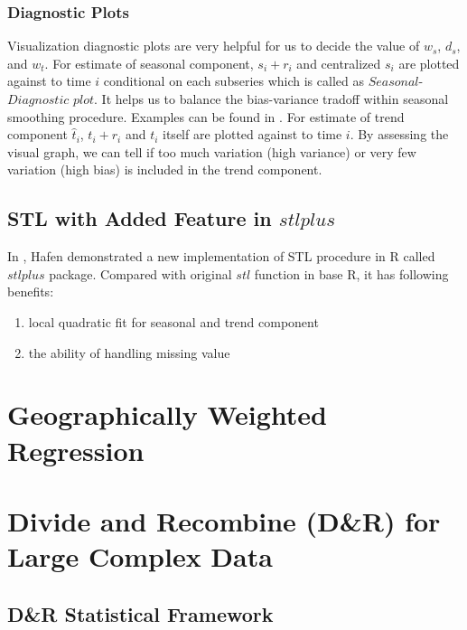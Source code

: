 \subsubsection{Diagnostic Plots}

Visualization diagnostic plots are very helpful for us to decide the value of 
$w_s$, $d_s$, and $w_t$. For estimate of seasonal component, $s_i + r_i$ and 
centralized $s_i$ are plotted against to time $i$ conditional on each subseries 
which is called as $Seasonal$-$Diagnostic$ $plot$. It helps us to balance the
bias-variance tradoff within seasonal smoothing procedure. Examples can be found
in \cite{Cleveland:1990}.
For estimate of trend component $\hat t_i$, $t_i + r_i$ and $t_i$ itself are 
plotted against to time $i$. By assessing the visual graph, we can tell if too
much variation (high variance) or very few variation (high bias) is included in
the trend component.

\subsection{STL with Added Feature in $stlplus$}

In \cite{hafen2010local}, Hafen demonstrated a new implementation of STL procedure
in R called $stlplus$ package. Compared with original $stl$ function in base R,
it has following benefits:
\begin{enumerate}

\item local quadratic fit for seasonal and trend component
\item the ability of handling missing value

\end{enumerate}



\section{Geographically Weighted Regression}

\section{Divide and Recombine (D\&R) for Large Complex Data}

\subsection{D\&R Statistical Framework}

